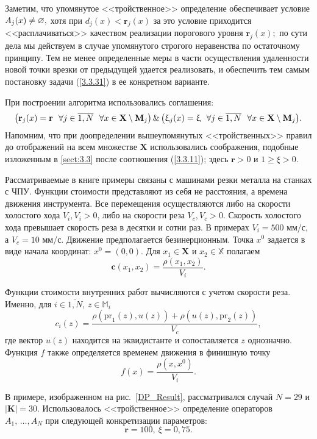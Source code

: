 Заметим, что упомянутое <<тройственное>> определение обеспечивает условие
$A_j(x) \neq \varnothing,$
хотя при $d_j(x) < \mathbf{r}_j(x)$
за это условие приходится <<расплачиваться>> качеством реализации порогового уровня
$\mathbf{r}_j(x);$
по сути дела мы действуем в случае упомянутого строгого
неравенства по остаточному принципу.
Тем не менее определенные меры в части
осуществления удаленности новой точки врезки от предыдущей удается реализовать,
и обеспечить тем самым постановку задачи (\ref{3.3.31})
в ее конкретном варианте.

При построении алгоритма использовались соглашения:
$$
  \bigl(\mathbf{r}_j(x) = \mathbf{r}\ \ \fa j\in \ov{1,N}\ \ \fa x\in
  \mathbf{X}\setminus \mathbf{M}_j\bigl)\,\&\,\bigl(\xi_j(x) = \xi\ \ \fa
  j\in \ov{1,N}\ \ \fa x\in \mathbf{X}\setminus \mathbf{M}_j\bigl)
  .
$$
Напомним, что при доопределении вышеупомянутых <<тройственных>> правил до
отображений на всем множестве $\mathbf{X}$ использовались соображения,
подобные изложенным в \ref{sect:3.3}
после соотношения (\ref{3.3.11});
здесь $\mathbf{r}>0$
и $1 \geqslant\xi >0$.

Рассматриваемые в книге примеры связаны с машинами резки металла на станках с ЧПУ.
Функции стоимости представляют из себя не расстояния,
а времена движения инструмента.
Все перемещения осуществляются либо на скорости холостого хода $V_i,V_i>0$,
либо на скорости реза
$V_c, V_c > 0$.
Скорость холостого хода превышает скорость
реза в десятки и сотни раз.
В примерах $V_i=500$ мм/с, а $V_c=10$ мм/с.
Движение предполагается безинерционным.
Точка $x^0$ задается в виде начала координат:
$x^0=(0,0)$.
Для
$x_1\in \mathbf{X}$ и
$x_2\in \mathbb{X}$ полагаем
\begin{equation}
  \label{ExtPrice}
  \mathbf{c}(x_1,x_2)=\frac{\rho (x_1,x_2)}{V_i}
  .
\end{equation}

Функции стоимости внутренних работ вычисляются с учетом скорости реза.
Именно, для
$i\in \overline{1,N}$, $z\in \mathbb{M}_i$
$$
  c_i(z)=\frac{\rho(\mbox{pr}_1(z),u(z))+\rho(u(z),\mbox{pr}_2(z))}{V_c}
  ,
$$
где вектор $u(z)$
находится на эквидистанте и сопоставляется $z$ однозначно.
Функция $f$
также определяется временем движения в финишную точку
\begin{equation}
  \label{TerminalPrice}
  f(x)=\frac{\rho (x,x^0)}{V_i}
  .
\end{equation}

В примере,
изображенном на рис.~\ref{DP_Result},
рассматривался случай
$N=29$ и
$|\mathbf{K}| =30$.
Использовалось <<тройственное>> определение операторов
$A_1,\,\ldots,A_N$
при следующей конкретизации параметров:
$$
  \mathbf{r}=100,\ \xi=0,75
  .
$$

